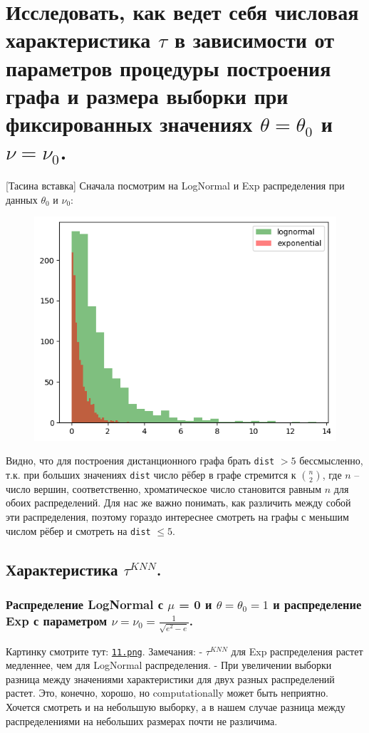 \documentclass{report}
\begin{document}
\chapter{Исследовать, как ведет себя числовая характеристика $\tau$ в зависимости от параметров процедуры построения графа и размера выборки при фиксированных значениях $\theta = \theta_0$ и $\nu = \nu_0$.}
[Тасина вставка] Сначала посмотрим на LogNormal и Exp распределения при данных $\theta_0$ и $\nu_0$:
\begin{figure}[h]
    \centering
    \includegraphics[width=0.5\linewidth]{distributions.png}
\end{figure}
\newline
\newline
Видно, что для построения дистанционного графа брать \texttt{dist} $> 5$ бессмысленно, т.к. при больших значениях \texttt{dist} число рёбер в графе стремится к $\binom{n}{2}$, где $n$ -- число вершин, соответственно, хроматическое число становится равным $n$ для обоих распределений.
\newline
\newline
Для нас же важно понимать, как различить между собой эти распределения, поэтому гораздо интереснее смотреть на графы с меньшим числом рёбер и смотреть на \texttt{dist} $\leq 5$.

\section{Характеристика $\tau^{KNN}$.}
\subsection{Распределение LogNormal с $\mu$ = 0 и $\theta = \theta_0 = 1$ и распределение Exp с параметром $\nu = \nu_0 = \frac{1}{\sqrt{e^2 - e}}$.}
Картинку смотрите тут: \texttt{\href{https://github.com/misshimichka/dm-random-graphs/blob/report/report/11.png}{11.png}}.
\newline
\newline
Замечания:
\newline
\newline
- $\tau^{KNN}$ для Exp распределения растет медленнее, чем для LogNormal распределения.
\newline
\newline
- При увеличении выборки разница между значениями характеристики для двух разных распределений растет. Это, конечно, хорошо, но computationally может быть неприятно. Хочется смотреть и на небольшую выборку, а в нашем случае разница между распределениями на небольших размерах почти не различима.
\newline
\end{document}
